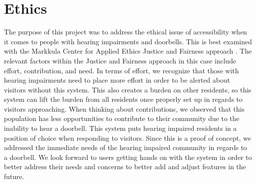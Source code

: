 \chapter{Ethics}

The purpose of this project was to address the ethical issue of accessibility when it comes to people with hearing impairments and doorbells. This is best examined with the Markkula Center for Applied Ethics Justice and Fairness approach \cite{website:markkula}. The relevant factors within the Justice and Fairness approach in this case include effort, contribution, and need. In terms of effort, we recognize that those with hearing impairments need to place more effort in order to be alerted about visitors without this system. This also creates a burden on other residents, so this system can lift the burden from all residents once properly set up in regards to visitors approaching. When thinking about contributions, we observed that this population has less opportunities to contribute to their community due to the inability to hear a doorbell. This system puts hearing impaired residents in a position of choice when responding to visitors. Since this is a proof of concept, we addressed the immediate needs of the hearing impaired community in regards to a doorbell. We look forward to users getting hands on with the system in order to better address their needs and concerns to better add and adjust features in the future.